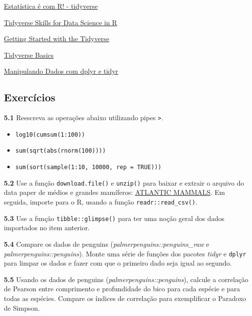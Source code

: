 \documentclass[
]{article}
\providecommand{\tightlist}{%
  \setlength{\itemsep}{0pt}\setlength{\parskip}{0pt}}
\begin{document}
\href{http://www.estatisticacomr.uff.br/?page_id=741}{Estatística é com R! - tidyverse}

\href{https://www.stephaniehicks.com/blog/tidyverse-skills-for-data-science-in-r-coursera-specialization/}{Tidyverse Skills for Data Science in R}

\href{https://www.datacamp.com/community/tutorials/tidyverse-tutorial-r}{Getting Started with the Tidyverse}

\href{https://www.dataquest.io/blog/load-clean-data-r-tidyverse/}{Tidyverse Basics}

\href{https://www.ufrgs.br/wiki-r/index.php?title=Manipulando_Dados_com_dplyr_e_tidyr}{Manipulando Dados com dplyr e tidyr}

\hypertarget{exercuxedcios-1}{%
\subsection{Exercícios}\label{exercuxedcios-1}}

\textbf{5.1}
Reescreva as operações abaixo utilizando pipes \texttt{\textbar{}\textgreater{}}.

\begin{itemize}
\tightlist
\item
  \texttt{log10(cumsum(1:100))}
\item
  \texttt{sum(sqrt(abs(rnorm(100))))}
\item
  \texttt{sum(sort(sample(1:10,\ 10000,\ rep\ =\ TRUE)))}
\end{itemize}

\textbf{5.2}
Use a função \texttt{download.file()} e \texttt{unzip()} para baixar e extrair o arquivo do data paper de médios e grandes mamíferos: \href{https://doi.org/10.1002/ecy.2785}{ATLANTIC MAMMALS}. Em seguida, importe para o R, usando a função \texttt{readr::read\_csv()}.

\textbf{5.3}
Use a função \texttt{tibble::glimpse()} para ter uma noção geral dos dados importados no item anterior.

\textbf{5.4}
Compare os dados de penguins (\emph{palmerpenguins::penguins\_raw} e \emph{palmerpenguins::penguins}). Monte uma série de funções dos pacotes \emph{tidyr} e \texttt{dplyr} para limpar os dados e fazer com que o primeiro dado seja igual ao segundo.

\textbf{5.5}
Usando os dados de penguins (\emph{palmerpenguins::penguins}), calcule a correlação de Pearson entre comprimento e profundidade do bico para cada espécie e para todas as espécies. Compare os índices de correlação para exemplificar o Paradoxo de Simpson.
\end{document}
